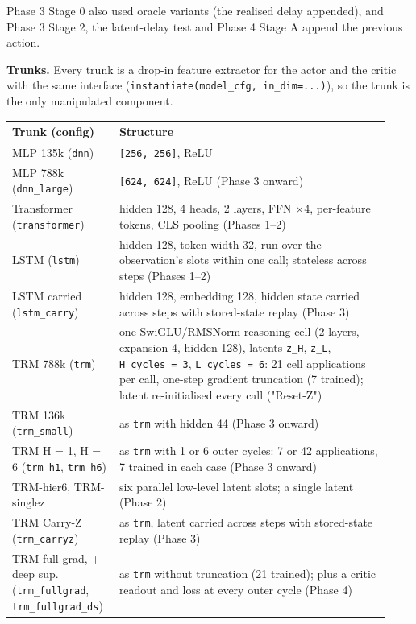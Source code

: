 \documentclass[11pt]{article}
\begin{document}
Phase 3 Stage 0 also used oracle variants (the realised delay appended), and Phase 3 Stage 2, the latent-delay test and Phase 4 Stage A append the previous action.



\textbf{Trunks.} Every trunk is a drop-in feature extractor for the actor and the critic with the same interface (\texttt{instantiate(model\_\allowbreak{}cfg,\allowbreak{} in\_\allowbreak{}dim=.\allowbreak{}.\allowbreak{}.\allowbreak{})}), so the trunk is the only manipulated component.



\begin{center}\small\begin{tabular}{>{\raggedright\arraybackslash}p{0.248\linewidth}>{\raggedright\arraybackslash}p{0.686\linewidth}}
\toprule
Trunk (config) & Structure \\
\midrule
MLP 135k (\texttt{dnn}) & \texttt{[256, 256]}, ReLU \\
MLP 788k (\texttt{dnn\_large}) & \texttt{[624, 624]}, ReLU (Phase 3 onward) \\
Transformer (\texttt{transformer}) & hidden 128, 4 heads, 2 layers, FFN $\times$4, per-feature tokens, CLS pooling (Phases 1--2) \\
LSTM (\texttt{lstm}) & hidden 128, token width 32, run over the observation's slots within one call; stateless across steps (Phases 1--2) \\
LSTM carried (\texttt{lstm\_carry}) & hidden 128, embedding 128, hidden state carried across steps with stored-state replay (Phase 3) \\
TRM 788k (\texttt{trm}) & one SwiGLU/RMSNorm reasoning cell (2 layers, expansion 4, hidden 128), latents \texttt{z\_H}, \texttt{z\_L}, \texttt{H\_cycles = 3}, \texttt{L\_cycles = 6}: 21 cell applications per call, one-step gradient truncation (7 trained); latent re-initialised every call ("Reset-Z") \\
TRM 136k (\texttt{trm\_small}) & as \texttt{trm} with hidden 44 (Phase 3 onward) \\
TRM H = 1, H = 6 (\texttt{trm\_h1}, \texttt{trm\_h6}) & as \texttt{trm} with 1 or 6 outer cycles: 7 or 42 applications, 7 trained in each case (Phase 3 onward) \\
TRM-hier6, TRM-singlez & six parallel low-level latent slots; a single latent (Phase 2) \\
TRM Carry-Z (\texttt{trm\_carryz}) & as \texttt{trm}, latent carried across steps with stored-state replay (Phase 3) \\
TRM full grad, + deep sup. (\texttt{trm\_fullgrad}, \texttt{trm\_\allowbreak{}fullgrad\_\allowbreak{}ds}) & as \texttt{trm} without truncation (21 trained); plus a critic readout and loss at every outer cycle (Phase 4) \\
\bottomrule
\end{tabular}\end{center}
\end{document}
